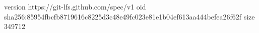 version https://git-lfs.github.com/spec/v1
oid sha256:85954fbcfb8719616c8225d3c48e49fc023e81e1b04ef613aa444befea26f62f
size 349712
